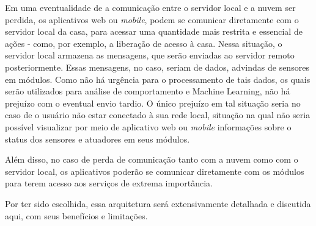 Em uma eventualidade de a comunicação entre o servidor local e a nuvem ser perdida, os aplicativos web ou \textit{mobile}, podem se comunicar diretamente com o servidor local da casa, para acessar uma quantidade mais restrita e essencial de ações - como, por exemplo, a liberação de acesso à casa. Nessa situação, o servidor local armazena as mensagens, que serão enviadas ao servidor remoto posteriormente. Essas mensagens, no caso, seriam de dados, advindas de sensores em módulos. Como não há urgência para o processamento de tais dados, os quais serão utilizados para análise de comportamento e Machine Learning, não há prejuízo com o eventual envio tardio. O único prejuízo em tal situação seria no caso de o usuário não estar conectado à sua rede local, situação na qual não seria possível visualizar por meio de aplicativo web ou \textit{mobile} informações sobre o status dos sensores e atuadores em seus módulos.

Além disso, no caso de perda de comunicação tanto com a nuvem como com o servidor local, os aplicativos poderão se comunicar diretamente com os módulos para terem acesso aos serviços de extrema importância.

Por ter sido escolhida, essa arquitetura será extensivamente detalhada e discutida aqui, com seus benefícios e limitações.
